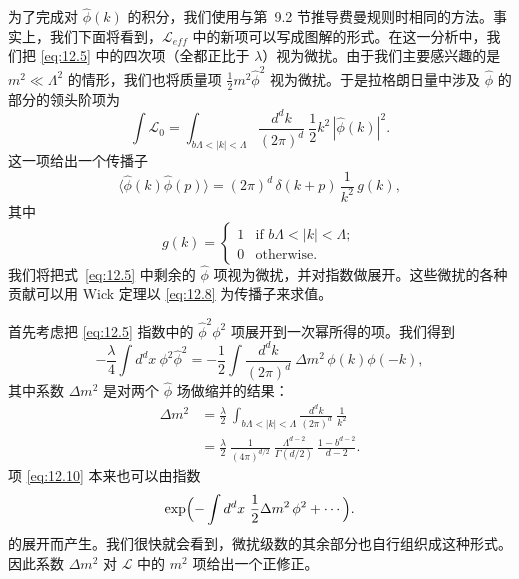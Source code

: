为了完成对 $\hat{\phi}(k)$ 的积分，我们使用与第~9.2 节推导费曼规则时相同的方法。事实上，我们下面将看到，$\mathcal{L}_{eff}$ 中的新项可以写成图解的形式。在这一分析中，我们把 \eqref{eq:12.5} 中的四次项（全都正比于 $\lambda$）视为微扰。由于我们主要感兴趣的是 $m^2 \ll \Lambda^2$ 的情形，我们也将质量项 $\tfrac{1}{2}m^2\hat{\phi}^2$ 视为微扰。于是拉格朗日量中涉及 $\hat{\phi}$ 的部分的领头阶项为
\begin{equation}
  \int \mathcal{L}_0 = \int_{b\Lambda<|k|<\Lambda} \frac{d^dk}{(2\pi)^d}\
    \frac{1}{2}k^2\,|\hat{\phi}(k)|^2 .
  \label{eq:12.7}
\end{equation}
这一项给出一个传播子
\begin{equation}
  \langle\hat{\phi}(k)\hat{\phi}(p)\rangle = (2\pi)^d\,\delta(k+p)\,
    \frac{1}{k^2}\,g(k) ,
  \label{eq:12.8}
\end{equation}
其中
\begin{equation}
  g(k) = \begin{cases}
    1 & \text{if } b\Lambda < |k| < \Lambda;\\
    0 & \text{otherwise}.
  \end{cases}
  \label{eq:12.9}
\end{equation}
我们将把式~\eqref{eq:12.5} 中剩余的 $\hat{\phi}$ 项视为微扰，并对指数做展开。这些微扰的各种贡献可以用 Wick 定理以 \eqref{eq:12.8} 为传播子来求值。

首先考虑把 \eqref{eq:12.5} 指数中的 $\hat{\phi}^2\phi^2$ 项展开到一次幂所得的项。我们得到
\begin{equation}
  -\frac{\lambda}{4}\int d^dx\ \phi^2\hat{\phi}^2 = -\frac{1}{2}\int
    \frac{d^dk}{(2\pi)^d}\ \Delta m^2\,\phi(k)\phi(-k) ,
  \label{eq:12.10}
\end{equation}
其中系数 $\Delta m^2$ 是对两个 $\hat{\phi}$ 场做缩并的结果：
\begin{equation}
  \begin{aligned}
    \Delta m^2 &= \frac{\lambda}{2}\ \int_{b\Lambda<|k|<\Lambda}
      \frac{d^dk}{(2\pi)^d}\ \frac{1}{k^2}\\
    &= \frac{\lambda}{2}\ \frac{1}{(4\pi)^{d/2}}\ \frac{\Lambda^{d-2}}{\Gamma(d/2)}
      \ \frac{1-b^{d-2}}{d-2} .
  \end{aligned}
  \label{eq:12.11}
\end{equation}
项 \eqref{eq:12.10} 本来也可以由指数
\begin{equation}
  \exp\Bigl( -\int d^dx\ \frac{1}{2}\Delta m^2\,\phi^2 + \cdots \Bigr) .
  \label{eq:12.12}
\end{equation}
的展开而产生。我们很快就会看到，微扰级数的其余部分也自行组织成这种形式。因此系数 $\Delta m^2$ 对 $\mathcal{L}$ 中的 $m^2$ 项给出一个正修正。

